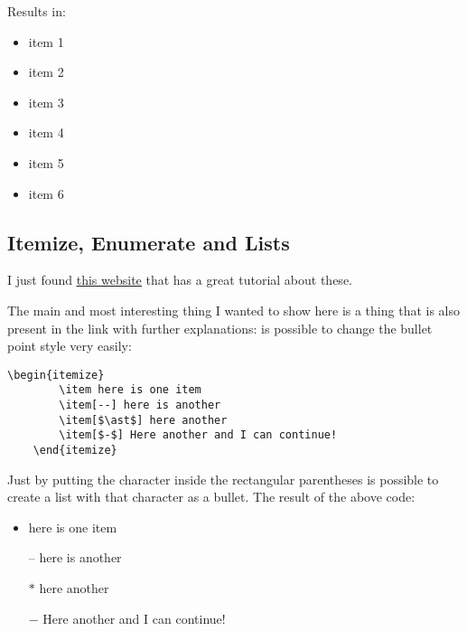 Results in:
\begin{multicols}{2}
    \begin{itemize}
        \item item 1
        \item item 2
        \item item 3
        \item item 4
        \item item 5
        \item item 6
    \end{itemize}
\end{multicols}












\subsection{Itemize, Enumerate and Lists}
\par I just found \href{https://www.latex-tutorial.com/tutorials/lists/}{\ul{this website}} that has a great tutorial about these. 
\par The main and most interesting thing I wanted to show here is a thing that is also present in the link with further explanations: is possible to change the bullet point style very easily:

\begin{lstlisting}[language=Tex]
    \begin{itemize}
        \item here is one item
        \item[--] here is another
        \item[$\ast$] here another
        \item[$-$] Here another and I can continue!
    \end{itemize}
\end{lstlisting}

Just by putting the character inside the rectangular parentheses is possible to create a list with that character as a bullet. The result of the above code:
\begin{itemize}
    \item here is one item
    \item[--] here is another
    \item[$\ast$] here another
    \item[$-$] Here another and I can continue!
\end{itemize}

